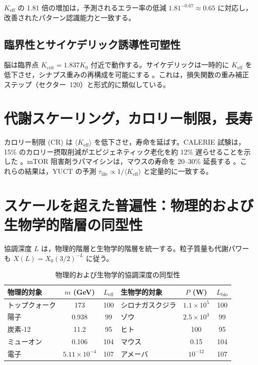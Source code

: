 \documentclass[11pt,a4paper]{article}
\begin{document}
	\(K_{\text{eff}}\) の 1.81 倍の増加は，予測されるエラー率の低減 \(1.81^{-0.67} \approx 0.65\) に対応し，改善されたパターン認識能力と一致する。
	
	\subsection{臨界性とサイケデリック誘導性可塑性}
	
	脳は臨界点 \(K_{\mathrm{crit}} = 1.837 K_0\) 付近で動作する。サイケデリックは一時的に \(K_{\text{eff}}\) を低下させ，シナプス重みの再構成を可能にする \cite{CarhartHarris2018, CarhartHarris2023}。これは，損失関数の重み補正ステップ（セクター~120）と形式的に類似している。
	
	\section{代謝スケーリング，カロリー制限，長寿}
	\label{sec:metabolism}
	
	カロリー制限 (CR) は \(\langle K_{\text{eff}} \rangle\) を低下させ，寿命を延ばす。CALERIE 試験は，15\% のカロリー摂取削減がエピジェネティック老化を約 12\% 遅らせることを示した \cite{CALERIE2018}。mTOR 阻害剤ラパマイシンは，マウスの寿命を 20--30\% 延長する \cite{Miller2022}。これらの結果は，YUCT の予測 \(\tau_{\text{life}} \propto 1/\langle K_{\text{eff}} \rangle\) と定量的に一致する。
	
	\section{スケールを超えた普遍性：物理的および生物学的階層の同型性}
	\label{sec:isomorphism}
	
	協調深度 \(L\) は，物理的階層と生物学的階層を統一する。粒子質量も代謝パワーも \(X(L) = X_0 (3/2)^{-L}\) に従う。
	
	\begin{table}[H]
		\centering
		\caption{物理的および生物学的協調深度の同型性}
		\label{tab:isomorphism}
		\begin{tabular}{l c c l c c}
			\toprule
			\textbf{物理的対象} & \(m\) (GeV) & \(L_{\mathrm{eff}}\) & \textbf{生物学的対象} & \(P\) (W) & \(L_{\mathrm{bio}}\) \\
			\midrule
			トップクォーク & 173 & 100 & シロナガスクジラ & \(1.1\times10^5\) & 100 \\
			陽子 & 0.938 & 99 & ゾウ & \(2.5\times10^3\) & 99 \\
			炭素‑12 & 11.2 & 95 & ヒト & 100 & 95 \\
			ミューオン & 0.106 & 104 & マウス & 0.15 & 104 \\
			電子 & \(5.11\times10^{-4}\) & 107 & アメーバ & \(10^{-12}\) & 107 \\
			\bottomrule
		\end{tabular}
	\end{table}
	
\end{document}
